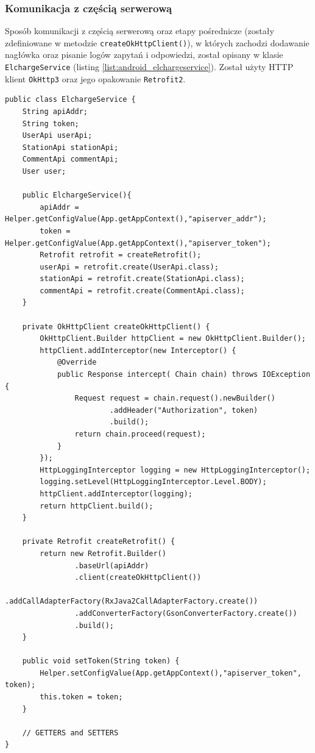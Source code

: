 \subsubsection{Komunikacja z częścią serwerową}
Sposób komunikacji z częścią serwerową oraz etapy pośrednicze (zostały zdefiniowane w metodzie \texttt{createOkHttpClient()}), w których zachodzi dodawanie nagłówka oraz pisanie logów zapytań i odpowiedzi, został opisany w klasie \texttt{ElchargeService} (listing \ref{list:android_elchargeservice}). Został użyty HTTP klient \texttt{OkHttp3} oraz jego opakowanie \texttt{Retrofit2}.
\begin{lstlisting}[label=list:android_elchargeservice,caption=obsługa komunikacji z częścią serwerową.,basicstyle=\tiny\ttfamily]
    public class ElchargeService {
    String apiAddr;
    String token;
    UserApi userApi;
    StationApi stationApi;
    CommentApi commentApi;
    User user;

    public ElchargeService(){
        apiAddr = Helper.getConfigValue(App.getAppContext(),"apiserver_addr");
        token = Helper.getConfigValue(App.getAppContext(),"apiserver_token");
        Retrofit retrofit = createRetrofit();
        userApi = retrofit.create(UserApi.class);
        stationApi = retrofit.create(StationApi.class);
        commentApi = retrofit.create(CommentApi.class);
    }

    private OkHttpClient createOkHttpClient() {
        OkHttpClient.Builder httpClient = new OkHttpClient.Builder();
        httpClient.addInterceptor(new Interceptor() {
            @Override
            public Response intercept( Chain chain) throws IOException {
                Request request = chain.request().newBuilder()
                        .addHeader("Authorization", token)
                        .build();
                return chain.proceed(request);
            }
        });
        HttpLoggingInterceptor logging = new HttpLoggingInterceptor();
        logging.setLevel(HttpLoggingInterceptor.Level.BODY);
        httpClient.addInterceptor(logging);
        return httpClient.build();
    }

    private Retrofit createRetrofit() {
        return new Retrofit.Builder()
                .baseUrl(apiAddr)
                .client(createOkHttpClient())
                .addCallAdapterFactory(RxJava2CallAdapterFactory.create())
                .addConverterFactory(GsonConverterFactory.create())
                .build();
    }

    public void setToken(String token) {
        Helper.setConfigValue(App.getAppContext(),"apiserver_token", token);
        this.token = token;
    }

    // GETTERS and SETTERS
}
\end{lstlisting}

